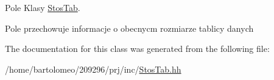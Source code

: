 Pole Klasy \hyperlink{class_stos_tab}{Stos\-Tab}. 

Pole przechowuje informacje o obecnycm rozmiarze tablicy danych 

The documentation for this class was generated from the following file\-:\begin{DoxyCompactItemize}
\item 
/home/bartolomeo/209296/prj/inc/\hyperlink{_stos_tab_8hh}{Stos\-Tab.\-hh}\end{DoxyCompactItemize}
